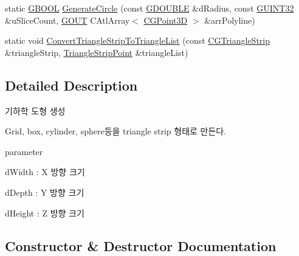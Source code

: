 \begin{DoxyCompactItemize}
\item 
static \hyperlink{_g_types_8h_a2901915743626352a6820c5405f556dc}{G\+B\+O\+O\+L} \hyperlink{class_c_g_geometry_generator_ada9536d9b304b73a0779f73327f8e7b5}{Generate\+Circle} (const \hyperlink{_g_types_8h_afd05ac85f90ee8e2a733928545462cd4}{G\+D\+O\+U\+B\+L\+E} \&d\+Radius, const \hyperlink{_g_types_8h_a2e1a1c77d1349057202e2f34e071019c}{G\+U\+I\+N\+T32} \&u\+Slice\+Count, \hyperlink{_g_types_8h_a0858ec221262e635612871d70ca233ad}{G\+O\+U\+T} C\+Atl\+Array$<$ \hyperlink{class_c_g_point3_d}{C\+G\+Point3\+D} $>$ \&arr\+Polyline)
\item 
static void \hyperlink{class_c_g_geometry_generator_acd2aa192e64ce78c5d21753f15f5cddc}{Convert\+Triangle\+Strip\+To\+Triangle\+List} (const \hyperlink{class_c_g_triangle_strip}{C\+G\+Triangle\+Strip} \&triangle\+Strip, \hyperlink{_g_triangle_strip_8h_a469e63f2aaedd82d5b176dc74c4beaba}{Triangle\+Strip\+Point} \&triangle\+List)
\end{DoxyCompactItemize}


\subsection{Detailed Description}

\begin{DoxyItemize}
\item 기하학 도형 생성
\item Grid, box, cylinder, sphere등을 triangle strip 형태로 만든다.
\item parameter
\begin{DoxyItemize}
\item d\+Width \+: X 방향 크기
\item d\+Depth \+: Y 방향 크기
\item d\+Height \+: Z 방향 크기 
\end{DoxyItemize}
\end{DoxyItemize}

\subsection{Constructor \& Destructor Documentation}
\hypertarget{class_c_g_geometry_generator_ad07b10770acef62eda2aa5ed814d2100}{}
